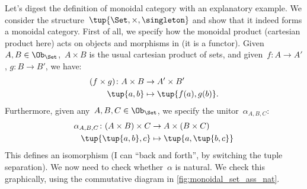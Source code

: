 \begin{example}
Let's digest the definition of monoidal category with an explanatory example. We consider the structure~$\tup{\Set,\times,\singleton}$ and show that it indeed forms a monoidal category. First of all, we specify how the monoidal product (cartesian product here) acts on objects and morphisms in \Set (it is a functor). Given~$A,B\in \Ob_{\Set}$,~$A\times B$ is the usual cartesian product of sets, and given~$f\colon A\to A'$, $g\colon B\to B'$, we have:
\begin{equation*}
    \begin{aligned}
    (f\times g)\colon A\times B&\to A'\times B'\\
    \tup{a,b}&\mapsto \tup{f(a),g(b)}.
    \end{aligned}
\end{equation*}
Furthermore, given any~$A,B,C\in \Ob_{\Set}$, we specify the unitor~$\alpha_{A,B,C}$:
\begin{equation*}
    \begin{aligned}
    \alpha_{A,B,C}\colon (A\times B)\times C&\to A\times (B\times C)\\
    \tup{\tup{a,b},c}&\mapsto \tup{a,\tup{b,c}}
    \end{aligned}
\end{equation*}
This defines an isomorphism (I can ``back and forth'', by switching the tuple separation). We now need to check whether~$\alpha$ is natural. We check this graphically, using the commutative diagram in \cref{fig:monoidal_set_ass_nat}.

\begin{center}
\end{center}
\end{example}

